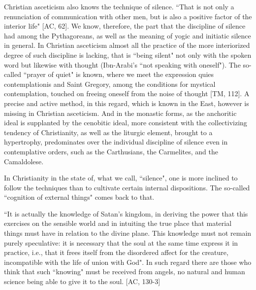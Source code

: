 Christian asceticism also knows the technique of silence. ``That is not only a renunciation of communication with other men, but is also a positive factor of the interior life" [AC, 62]. We know, therefore, the part that the discipline of silence had among the Pythagoreans, as well as the meaning of yogic and initiatic silence in general. In Christian asceticism almost all the practice of the more interiorized degree of such discipline is lacking, that is ``being silent" not only with the spoken word but likewise with thought (Ibn-Arabi's ``not speaking with oneself"). The so-called ``prayer of quiet" is known, where we meet the expression quies contemplationis and Saint Gregory, among the conditions for mystical contemplation, touched on freeing oneself from the noise of thought [TM, 112]. A precise and active method, in this regard, which is known in the East, however is missing in Christian asceticism. And in the monastic forms, as the anchoritic ideal is supplanted by the cenobitic ideal, more consistent with the collectivizing tendency of Christianity, as well as the liturgic element, brought to a hypertrophy, predominates over the individual discipline of silence even in contemplative orders, such as the Carthusians, the Carmelites, and the Camaldolese.

In Christianity in the state of, what we call, ``silence", one is more inclined to follow the techniques than to cultivate certain internal dispositions. The so-called ``cognition of external things" comes back to that.

``It is actually the knowledge of Satan's kingdom, in deriving the power that this exercises on the sensible world and in intuiting the true place that material things must have in relation to the divine plane. This knowledge must not remain purely speculative: it is necessary that the soul at the same time express it in practice, i.e., that it frees itself from the disordered affect for the creature, incompatible with the life of union with God". In such regard there are those who think that such ``knowing" must be received from angels, no natural and human science being able to give it to the soul. [AC, 130-3]

